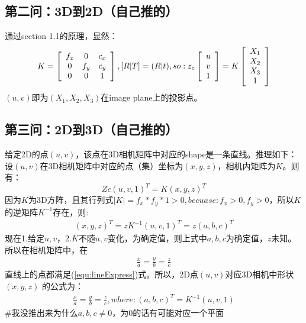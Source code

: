 \documentclass[UTF8]{ctexart}
\begin{document}
\subsection{第二问：3D到2D（自己推的）}
通过section 1.1的原理，显然：
\begin{align*}
K = \left [ \begin{array}{ c c c}
f_x & 0   & c_x \\
0  & f_y & c_y \\
0  & 0   & 1 \\
\end{array} \right ],
[R|T]=(R|t), so:
 z_c \left[ \begin{array}{c}  u \\ v \\ 1 \end{array} \right] =
 K \left[ \begin{array}{c}   X_1 \\  X_2 \\  X_3 \\ 1  \end{array}\right]
\end{align*}
$(u,v)$即为$(X_1,X_2,X_3)$在image plane上的投影点。
\subsection{第三问：2D到3D（自己推的）}
给定2D的点$(u,v)$，该点在3D相机矩阵中对应的shape是一条直线。推理如下：
设$(u,v)$在3D相机矩阵中对应的点（集）坐标为$(x,y,z)$，相机内矩阵为$K$。则有：
$$Zc(u,v,1)^T=K(x,y,z)^T$$
因为$K$为3D方阵，且其行列式$|K|=f_x*f_y*1>0, becuase:f_x>0, f_y>0$，所以$K$的逆矩阵$K^{-1}$存在，则:
\begin{align}
(x,y,z)^T=zK^{-1}(u,v,1)^T=z(a,b,c)^T\label{equ:lineExpress}
\end{align}
现在1.给定$u,v$，2.$K$不随$u,v$变化，为确定值，则上式中$a,b,c$为确定值，$z$未知。所以在相机矩阵中，在
\begin{align}
\frac{x}{a}=\frac{y}{b}=\frac{z}{c}
\end{align}
直线上的点都满足(\ref{equ:lineExpress})式。所以，2D点$(u,v)$对应3D相机中形状$(x,y,z)$ 的公式为：
\begin{align}
\frac{x}{a}=\frac{y}{b}=\frac{z}{c},where:(a,b,c)^T=K^{-1}(u,v,1)\label{formula:pixel2camera3D}
\end{align}
\#我没推出来为什么$a,b,c\neq0$，为0的话有可能对应一个平面
\end{document}
